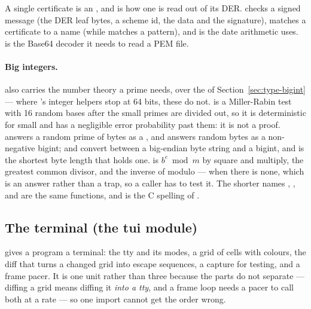 A single certificate is an , and  is
how one is read out of its DER.
 checks a signed message
(the DER leaf bytes, a scheme id, the data and the signature),
 matches a certificate to a name (while
 matches a  pattern), and
 is the date arithmetic
 uses.  is the Base64 decoder it
needs to read a PEM file.

\paragraph{Big integers.}  also carries the number theory a
prime needs, over the  of Section~\ref{sec:type-bigint} --- where
's integer helpers stop at 64 bits, these do not.
 is a Miller-Rabin test with 16 random bases after
the small primes are divided out, so it is deterministic for small  and
has a negligible error probability past them: it is not a proof.
 answers a random prime of  bytes as a
\ic{[byte]}, and  answers  random bytes as a
non-negative bigint;
 and  convert
between a big-endian byte string and a bigint, and 
is the shortest byte length that holds one.  is
$b^e \bmod m$ by square and multiply,  the
greatest common divisor, and  the inverse
of  modulo  ---  when there is none, which is an answer
rather than a trap, so a caller has to test it. The shorter names
, ,  and  are the same
functions, and  is the C spelling of .

\subsection{The terminal (the tui module)}
\label{sec:builtin-tui}

 gives a program a terminal: the tty and its modes, a grid of
cells with colours, the diff that turns a changed grid into escape sequences, a
capture for testing, and a frame pacer. It is one unit rather than three
because the parts do not separate --- diffing a grid means diffing it
\emph{into a tty}, and a frame loop needs a pacer to call both at a rate --- so
one import cannot get the order wrong.

